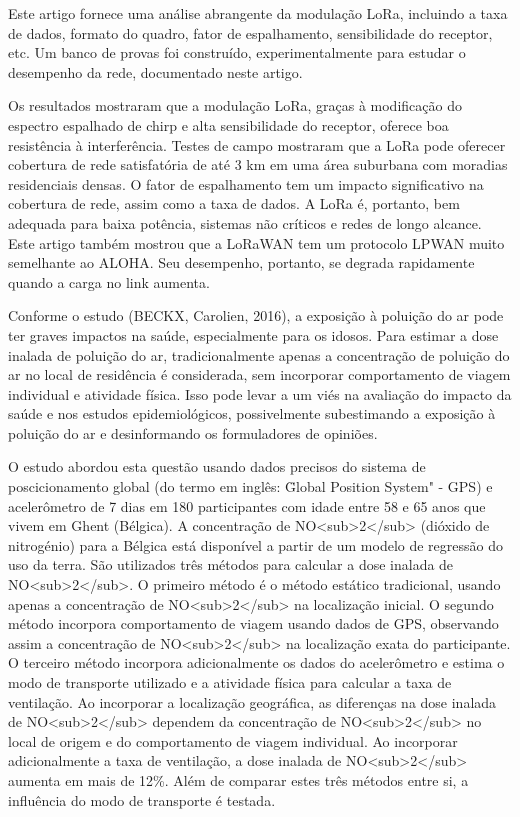 Este artigo fornece uma análise abrangente da modulação LoRa, incluindo a taxa de dados, formato do 
quadro, fator de espalhamento, sensibilidade do receptor, etc. Um banco de provas foi construído, 
experimentalmente para estudar o desempenho da rede, documentado neste artigo. 

Os resultados mostraram que a modulação LoRa, graças à modificação do espectro espalhado de chirp e 
alta sensibilidade do receptor, oferece boa resistência à interferência. Testes de campo mostraram 
que a LoRa pode oferecer cobertura de rede satisfatória de até 3 km em uma área suburbana com 
moradias residenciais densas. O fator de espalhamento tem um impacto significativo na cobertura de 
rede, assim como a taxa de dados. A LoRa é, portanto, bem adequada para baixa potência, sistemas não 
críticos e redes de longo alcance. Este artigo também mostrou que a LoRaWAN tem um protocolo LPWAN 
muito semelhante ao ALOHA. Seu desempenho, portanto, se degrada rapidamente quando a carga no link 
aumenta.

Conforme o estudo (BECKX, Carolien, 2016), a exposição à poluição do ar pode ter graves impactos na 
saúde, especialmente para os idosos. Para estimar a dose inalada de poluição do ar, tradicionalmente 
apenas a concentração de poluição do ar no local de residência é considerada, sem incorporar 
comportamento de viagem individual e atividade física. Isso pode levar a um viés na avaliação do 
impacto da saúde e nos estudos epidemiológicos, possivelmente subestimando a exposição à poluição do 
ar e desinformando os formuladores de opiniões. 

O estudo abordou esta questão usando dados precisos do sistema de poscicionamento global (do termo 
em inglês: \"Global Position System" -  GPS) e acelerômetro de 7 dias em 180 participantes com idade 
entre 58 e 65 anos que vivem em Ghent (Bélgica). A concentração de NO<sub>2</sub> (dióxido de 
nitrogénio) para a Bélgica está disponível a partir de um modelo de regressão do uso da terra. São 
utilizados três métodos para calcular a dose inalada de NO<sub>2</sub>. O primeiro método é o método 
estático tradicional, usando apenas a concentração de NO<sub>2</sub> na localização inicial. O 
segundo método incorpora comportamento de viagem usando dados de GPS, observando assim a concentração 
de NO<sub>2</sub> na localização exata do participante. O terceiro método incorpora adicionalmente os 
dados do acelerômetro e estima o modo de transporte utilizado e a atividade física para calcular a 
taxa de ventilação. Ao incorporar a localização geográfica, as diferenças na dose inalada de 
NO<sub>2</sub> dependem da concentração de NO<sub>2</sub> no local de origem e do comportamento de 
viagem individual. Ao incorporar adicionalmente a taxa de ventilação, a dose inalada de 
NO<sub>2</sub> aumenta em mais de 12\%. Além de comparar estes três métodos entre si, a influência 
do modo de transporte é testada. 

